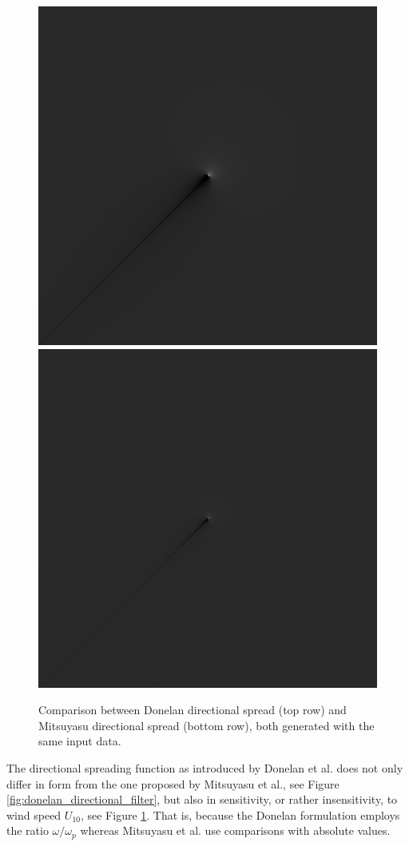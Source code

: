 \begin{figure}
{ \includegraphics[scale=0.115]{figures/dfilt_wur_sqrt50.png}
 }
 \hfill
 \subtop
 {
 \includegraphics[scale=0.115]{figures/dfilt_wur_sqrt200.png}
 }
\caption{Comparison between Donelan directional spread (top row) and Mitsuyasu 
directional spread (bottom row), both generated with the same input data.}
\label{fig:directional_filter_comp}
\end{figure}
%
The directional spreading function as introduced by Donelan et al. does 
not only differ in form from the one proposed by Mitsuyasu et al., see Figure 
\ref{fig:donelan_directional_filter}, but also in sensitivity, or rather 
insensitivity, to wind speed $U_{10}$, see Figure 
\ref{fig:directional_filter_comp}. That is, because the Donelan formulation 
employs the ratio $\omega/\omega_p$ whereas Mitsuyasu et al. use comparisons 
with absolute values.\\

